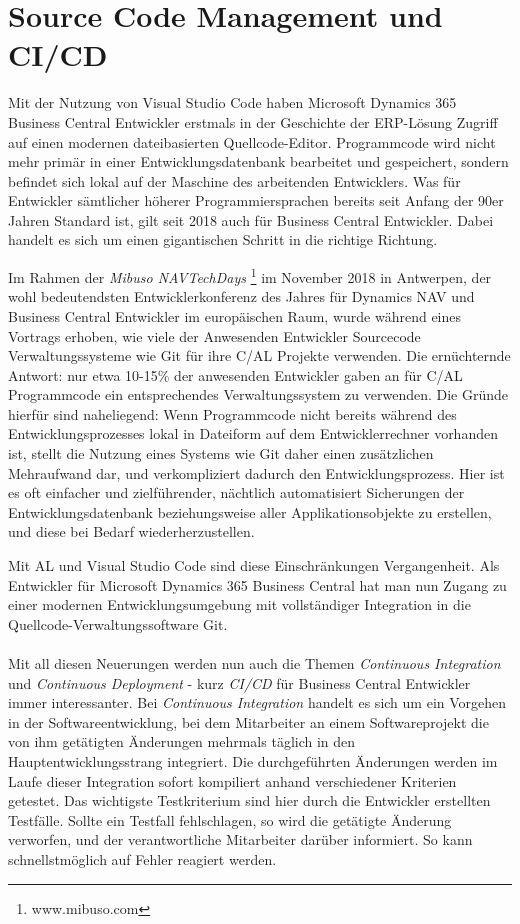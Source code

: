 \section{Source Code Management und CI/CD}
Mit der Nutzung von Visual Studio Code haben Microsoft Dynamics 365 Business Central Entwickler erstmals in der Geschichte der ERP-Lösung Zugriff auf einen modernen dateibasierten Quellcode-Editor. Programmcode wird nicht mehr primär in einer Entwicklungsdatenbank bearbeitet und gespeichert, sondern befindet sich lokal auf der Maschine des arbeitenden Entwicklers. Was für Entwickler sämtlicher höherer Programmiersprachen bereits seit Anfang der 90er Jahren Standard ist, gilt seit 2018 auch für Business Central Entwickler. Dabei handelt es sich um einen gigantischen Schritt in die richtige Richtung. 

Im Rahmen der \textit{Mibuso NAVTechDays} \footnote{www.mibuso.com} im November 2018 in Antwerpen, der wohl bedeutendsten Entwicklerkonferenz des Jahres für Dynamics NAV und Business Central Entwickler im europäischen Raum, wurde während eines Vortrags erhoben, wie viele der Anwesenden Entwickler Sourcecode Verwaltungssysteme wie Git für ihre C/AL Projekte verwenden. Die ernüchternde Antwort: nur etwa 10-15\% der anwesenden Entwickler gaben an für C/AL Programmcode ein entsprechendes Verwaltungssystem zu verwenden. Die Gründe hierfür sind naheliegend: Wenn Programmcode nicht bereits während des Entwicklungsprozesses lokal in Dateiform auf dem Entwicklerrechner vorhanden ist, stellt die Nutzung eines Systems wie Git daher einen zusätzlichen Mehraufwand dar, und verkompliziert dadurch den Entwicklungsprozess. Hier ist es oft einfacher und zielführender, nächtlich automatisiert Sicherungen der Entwicklungsdatenbank beziehungsweise aller Applikationsobjekte zu erstellen, und diese bei Bedarf wiederherzustellen.

Mit AL und Visual Studio Code sind diese Einschränkungen Vergangenheit. Als Entwickler für Microsoft Dynamics 365 Business Central hat man nun Zugang zu einer modernen Entwicklungsumgebung mit vollständiger Integration in die Quellcode-Verwaltungssoftware Git. 

\paragraph{}
Mit all diesen Neuerungen werden nun auch die Themen \textit{Continuous Integration} und \textit{Continuous Deployment} - kurz \textit{CI/CD} für Business Central Entwickler immer interessanter. Bei \textit{Continuous Integration} handelt es sich um ein Vorgehen in der Softwareentwicklung, bei dem Mitarbeiter an einem Softwareprojekt die von ihm getätigten Änderungen mehrmals täglich in den Hauptentwicklungsstrang integriert\cite{fowler2006continuous}. Die durchgeführten Änderungen werden im Laufe dieser Integration sofort kompiliert anhand verschiedener Kriterien getestet. Das wichtigste Testkriterium sind hier durch die Entwickler erstellten Testfälle. Sollte ein Testfall fehlschlagen, so wird die getätigte Änderung verworfen, und der verantwortliche Mitarbeiter darüber informiert. So kann schnellstmöglich auf Fehler reagiert werden. 
 
